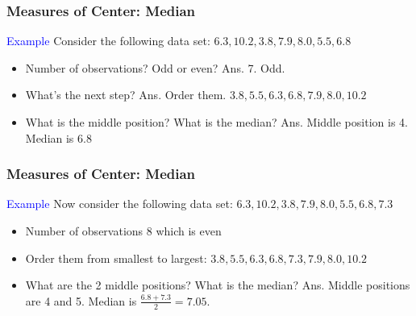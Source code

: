 \documentclass{beamer}\usepackage[]{graphicx}\usepackage[]{color}
\begin{document}
\begin{frame}

\frametitle{Measures of Center: Median}
\textcolor{blue}{Example} Consider the following data set:\newline
$6.3, 10.2, 3.8, 7.9, 8.0, 5.5, 6.8$
\begin{itemize}
\item Number of observations? Odd or even? \pause \newline
      Ans. 7. Odd. \pause 
\item What's the next step? \pause \newline
      Ans. Order them. $3.8, 5.5, 6.3, 6.8, 7.9, 8.0, 10.2$ \pause
\item What is the middle position? What is the median? \pause \newline
      Ans. Middle position is 4. Median is 6.8

\end{itemize}

\end{frame}

\begin{frame}
\frametitle{Measures of Center: Median}
\textcolor{blue}{Example} Now consider the following data set:\newline
$6.3, 10.2, 3.8, 7.9, 8.0, 5.5, 6.8, 7.3$
\begin{itemize}
\item Number of observations 8 which is even \pause

\item Order them from smallest to largest: $3.8, 5.5, 6.3, 6.8, 7.3, 7.9, 8.0, 10.2$\pause

\item What are the 2 middle positions? What is the median? \pause \newline
      Ans. Middle positions are 4 and 5. Median is $\tfrac{6.8 + 7.3}{2} =7.05$.
\end{itemize}

\end{frame}
\end{document}
